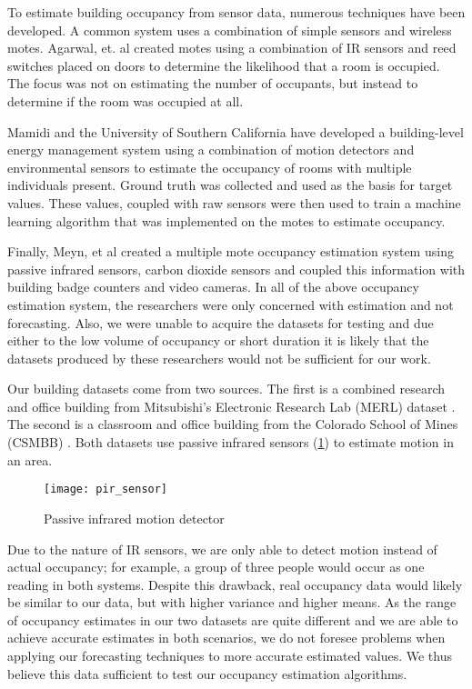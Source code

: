 To estimate building occupancy from sensor data, numerous techniques have been developed.  A common system uses a combination of simple sensors and wireless motes.  Agarwal, et. al \cite{agarwal2010} created motes using a combination of IR sensors and reed switches placed on doors to determine the likelihood that a room is occupied.  The focus was not on estimating the number of occupants, but instead to determine if the room was occupied at all.  

Mamidi \cite{mamidi2012} and the University of Southern California have developed a building-level energy management system using a combination of motion detectors and environmental sensors to estimate the occupancy of rooms with multiple individuals present.  Ground truth was collected and used as the basis for target values.  These values, coupled with raw sensors were then used to train a machine learning algorithm that was implemented on the motes to estimate occupancy.

Finally, Meyn, et al \cite{meyn2009} created a multiple mote occupancy estimation system using passive infrared sensors, carbon dioxide sensors and coupled this information with building badge counters and video cameras.  In all of the above occupancy estimation system, the researchers were only concerned with estimation and not forecasting.  Also, we were unable to acquire the datasets for testing and due either to the low volume of occupancy or short duration it is likely that the datasets produced by these researchers would not be sufficient for our work.

Our building datasets come from two sources.  The first is a combined research and office building from Mitsubishi's Electronic Research Lab (MERL) dataset \cite{Wren2007}.  The second is a classroom and office building from the Colorado School of Mines (CSMBB) \cite{Hoff2009, Howard2013}.  Both datasets use passive infrared sensors (\ref{fig:pirsensor}) to estimate motion in an area.  

\begin{figure}[h]
	\begin{center}
		\texttt{[image: pir\_sensor]}
	\end{center}
	\caption{Passive infrared motion detector}
	\label{fig:pirsensor}
\end{figure}

Due to the nature of IR sensors, we are only able to detect motion instead of actual occupancy; for example, a group of three people would occur as one reading in both systems.  Despite this drawback, real occupancy data would likely be similar to our data, but with higher variance and higher means.  As the range of occupancy estimates in our two datasets are quite different and we are able to achieve accurate estimates in both scenarios, we do not foresee problems when applying our forecasting techniques to more accurate estimated values.  We thus believe this data sufficient to test our occupancy estimation algorithms.

